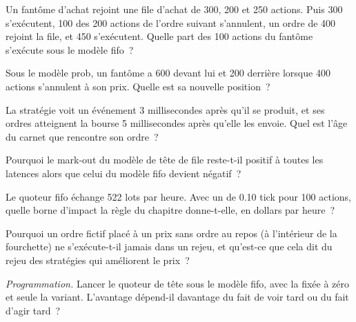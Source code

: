 \begin{exercise}[$\star$]\label{exo:rs:order-book-replay-simulation:1}
Un fantôme d'achat rejoint une file d'achat de 300, 200 et 250 actions. Puis 300 s'exécutent, 100 des 200 actions de l'ordre suivant s'annulent, un ordre de 400 rejoint la file, et 450 s'exécutent. Quelle
part des 100 actions du fantôme s'exécute sous le modèle fifo~?
\end{exercise}

\begin{exercise}[$\star$]\label{exo:rs:order-book-replay-simulation:2}
Sous le modèle prob, un fantôme a 600 devant lui et 200 derrière lorsque 400 actions s'annulent à son prix. Quelle est sa nouvelle position~?
\end{exercise}

\begin{exercise}[$\star$]\label{exo:rs:order-book-replay-simulation:3}
La stratégie voit un événement 3 millisecondes après qu'il se produit, et ses ordres atteignent la bourse 5 millisecondes après qu'elle les envoie. Quel est l'âge du carnet que rencontre son
ordre~?
\end{exercise}

\begin{exercise}[$\star\star$]\label{exo:rs:order-book-replay-simulation:4}
Pourquoi le mark-out du modèle de tête de file reste-t-il positif à toutes les latences alors que celui du modèle fifo devient négatif~?
\end{exercise}

\begin{exercise}[$\star\star$]\label{exo:rs:order-book-replay-simulation:5}
Le quoteur fifo échange 522 lots par heure. Avec un  de 0.10 tick pour 100 actions, quelle borne d'impact la règle du chapitre donne-t-elle, en dollars par heure~?
\end{exercise}

\begin{exercise}[$\star\star$]\label{exo:rs:order-book-replay-simulation:6}
Pourquoi un ordre fictif placé à un prix sans ordre au repos (à l'intérieur de la fourchette) ne s'exécute-t-il jamais dans un rejeu, et qu'est-ce que cela dit du rejeu des stratégies
qui améliorent le prix~?
\end{exercise}

\begin{exercise}[$\star\star\star$]\label{exo:rs:order-book-replay-simulation:7}
\emph{Programmation.} Lancer le quoteur de tête sous le modèle fifo, avec la  fixée à zéro et seule la  variant. L'avantage
dépend-il davantage du fait de voir tard ou du fait d'agir tard~?
\end{exercise}

